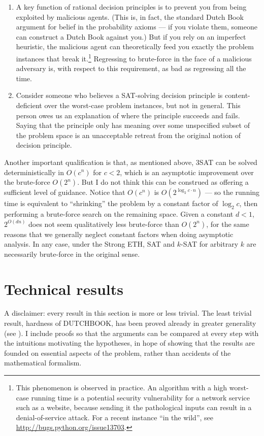 \documentclass[letterpaper,12pt]{article}
\begin{document}
\begin{enumerate}
\item
A key function of rational decision principles is to prevent you from being exploited by malicious agents. (This is, in fact, the standard Dutch Book argument for belief in the probability axioms --- if you violate them, someone can construct a Dutch Book against you.) But if you rely on an imperfect heuristic, the malicious agent can theoretically feed you exactly the problem instances that break it.\footnote{This phenomenon is observed in practice. An algorithm with a high worst-case running time is a potential security vulnerability for a network service such as a website, because sending it the pathological inputs can result in a denial-of-service attack. For a recent instance ``in the wild'', see \url{http://bugs.python.org/issue13703}.} Regressing to brute-force in the face of a malicious adversary is, with respect to this requirement, as bad as regressing all the time.
\item
Consider someone who believes a SAT-solving decision principle is content-deficient over the worst-case problem instances, but not in general. This person owes us an explanation of where the principle succeeds and fails. Saying that the principle only has meaning over some unspecified subset of the problem space is an unacceptable retreat from the original notion of decision principle.
\end{enumerate}

Another important qualification is that, as mentioned above, 3SAT can be solved deterministically in $O(c^n)$ for $c < 2$, which is an asymptotic improvement over the brute-force $O(2^n)$. But I do not think this can be construed as offering a sufficient level of guidance. Notice that $O(c^n)$ is $O(2^{\log_2 c \cdot n})$ --- so the running time is equivalent to ``shrinking'' the problem by a constant factor of $\log_2 c$, then performing a brute-force search on the remaining space. Given a constant $d < 1$, $2^{O(dn)}$ does not seem qualitatively less brute-force than $O(2^n)$, for the same reasons that we generally neglect constant factors when doing asymptotic analysis. In any case, under the Strong ETH, SAT and $k$-SAT for arbitrary $k$ are necessarily brute-force in the original sense.

\section{Technical results}
A disclaimer: every result in this section is more or less trivial. The least trivial result, hardness of DUTCHBOOK, has been proved already in greater generality (see \cite{paris1994uncertain}). I include proofs so that the arguments can be compared at every step with the intuitions motivating the hypotheses, in hope of showing that the results are founded on essential aspects of the problem, rather than accidents of the mathematical formalism.
\end{document}
